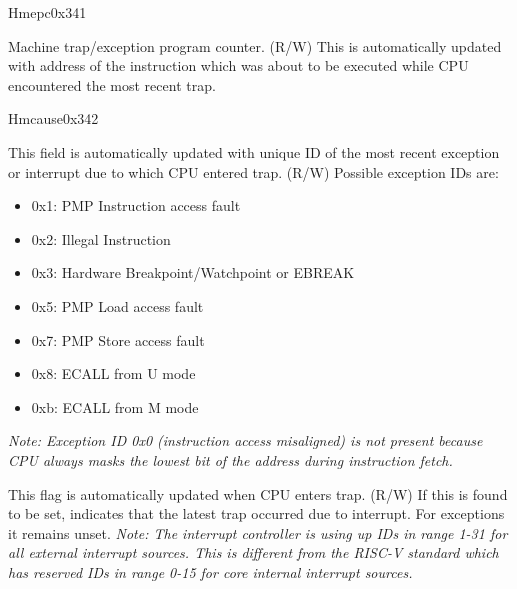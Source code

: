 \begin{register}{H}{mepc}{0x341}\label{regdesc:MEPC}
%
\regnewline%
\begin{regdesc}\begin{reglist}
\label{fielddesc:MEPC}\item [MEPC] Machine trap/exception program counter. (R/W) \newline This is automatically updated with address of the instruction which was about to be executed while CPU encountered the most recent trap.
\end{reglist}\end{regdesc}
\end{register}

\begin{register}{H}{mcause}{0x342}\label{regdesc:MCAUSE}
%
%
%
\regnewline%
\begin{regdesc}\begin{reglist}
\label{fielddesc:MCAUSECODE}\item [Exception Code] This field is automatically updated with unique ID of the most recent exception or interrupt due to which CPU entered trap. (R/W)
\newline Possible exception IDs are:
\begin{itemize}
    \setlength\itemsep{-1em}
    \item 0x1: PMP Instruction access fault
    \item 0x2: Illegal Instruction
    \item 0x3: Hardware Breakpoint/Watchpoint or EBREAK
    \item 0x5: PMP Load access fault
    \item 0x7: PMP Store access fault
    \item 0x8: ECALL from U mode
    \item 0xb: ECALL from M mode
\end{itemize}
\textit {Note: Exception ID 0x0 (instruction access misaligned) is not present because CPU always masks the lowest bit of the address during instruction fetch.}
\label{fielddesc:MCAUSEINT}\item [Interrupt Flag] This flag is automatically updated when CPU enters trap. (R/W) \newline If this is found to be set, indicates that the latest trap occurred due to interrupt. For exceptions it remains unset. \newline \textit {Note: The interrupt controller is using up IDs in range 1-31 for all external interrupt sources. This is different from the RISC-V standard which has reserved IDs in range 0-15 for core internal interrupt sources.}
\end{reglist}\end{regdesc}
\end{register}

